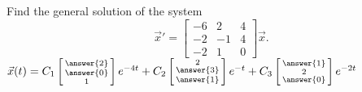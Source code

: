 \documentclass{ximera}
\begin{document}
\begin{exercise}%
    Find the general solution of the system
    \begin{equation*}
        {\vec{x}}' = 
        \begin{bmatrix} 
            -6 & 2 & 4 \\ 
            -2 & -1 & 4 \\ 
            -2 & 1 & 0 
        \end{bmatrix} \vec{x}.
    \end{equation*}
    $\vec{x}(t) = C_1 \left[\begin{smallmatrix} \answer{2} \\ \answer{0} \\ 1 \end{smallmatrix}\right]e^{-4t} + C_2 \left[\begin{smallmatrix} 2 \\ \answer{3} \\ \answer{1} \end{smallmatrix}\right] e^{-t} + C_3 \left[\begin{smallmatrix} \answer{1} \\ 2 \\ \answer{0} \end{smallmatrix}\right] e^{-2t}$
\end{exercise}
\end{document}
